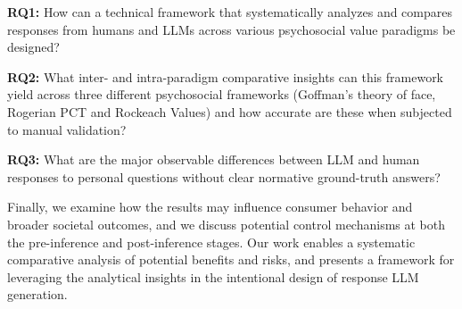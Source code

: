 \medskip\textbf{RQ1:} How can a technical framework that systematically analyzes and compares responses from humans and LLMs across various psychosocial value paradigms be designed?  

\medskip\textbf{RQ2:} What inter- and intra-paradigm comparative insights can this framework yield across three different psychosocial frameworks (Goffman’s theory of face, Rogerian PCT and Rockeach Values) and how accurate are these when subjected to manual validation?

\medskip\textbf{RQ3:} What are the major observable differences between LLM and human responses to personal questions without clear normative ground-truth answers? 

Finally, we examine how the results may influence consumer behavior and broader societal outcomes, and we discuss potential control mechanisms at both the pre-inference and post-inference stages. Our work enables a systematic comparative analysis of potential benefits and risks, and presents a framework for leveraging the analytical insights in the intentional design of response LLM generation.






